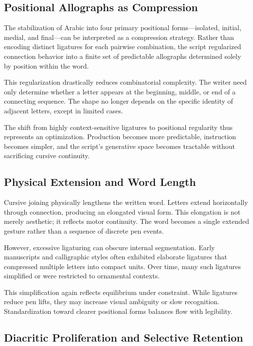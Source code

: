 \documentclass[11pt]{article}
\begin{document}
\subsection{Positional Allographs as Compression}

The stabilization of Arabic into four primary positional forms—isolated, initial, medial, and final—can be interpreted as a compression strategy. Rather than encoding distinct ligatures for each pairwise combination, the script regularized connection behavior into a finite set of predictable allographs determined solely by position within the word.

This regularization drastically reduces combinatorial complexity. The writer need only determine whether a letter appears at the beginning, middle, or end of a connecting sequence. The shape no longer depends on the specific identity of adjacent letters, except in limited cases.

The shift from highly context-sensitive ligatures to positional regularity thus represents an optimization. Production becomes more predictable, instruction becomes simpler, and the script’s generative space becomes tractable without sacrificing cursive continuity.

\subsection{Physical Extension and Word Length}

Cursive joining physically lengthens the written word. Letters extend horizontally through connection, producing an elongated visual form. This elongation is not merely aesthetic; it reflects motor continuity. The word becomes a single extended gesture rather than a sequence of discrete pen events.

However, excessive ligaturing can obscure internal segmentation. Early manuscripts and calligraphic styles often exhibited elaborate ligatures that compressed multiple letters into compact units. Over time, many such ligatures simplified or were restricted to ornamental contexts.

This simplification again reflects equilibrium under constraint. While ligatures reduce pen lifts, they may increase visual ambiguity or slow recognition. Standardization toward clearer positional forms balances flow with legibility.

\subsection{Diacritic Proliferation and Selective Retention}
\end{document}
